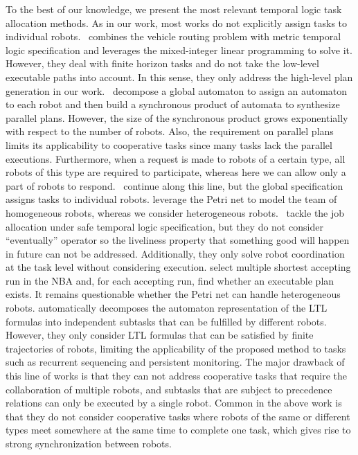 \documentclass[Afour,sageh,times]{sagej}
\begin{document}
To the best of our knowledge, we present the most relevant temporal logic task allocation methods. As in our work, most works do not explicitly assign tasks to individual robots.~\cite{karaman2011linear} combines the vehicle routing problem with metric temporal logic specification and leverages the mixed-integer linear programming to solve it. However, they deal with finite horizon tasks and do not take the low-level executable paths into account. In this sense, they only address the high-level plan generation in our work.~\cite{chen2011formal,leahy2015distributed} decompose a global automaton to assign an automaton to each robot and then build a synchronous product of automata to synthesize parallel plans. However, the size of the synchronous product grows exponentially with respect to the number of robots. Also, the requirement on parallel plans limits its applicability to cooperative tasks since many tasks lack the parallel executions. Furthermore, when a request is made to robots of a certain type, all robots of this type are required to participate, whereas here we can allow only a part of robots to respond.~\cite{ulusoy2013optimality} continue along this line, but
the global specification assigns tasks to individual robots. \cite{lacerda2019petri,kloetzer2020path} leverage the Petri net to model the team of homogeneous robots, whereas we consider heterogeneous robots.~\cite{lacerda2019petri} tackle the job allocation under safe temporal logic specification, but they do not consider ``eventually'' operator so the liveliness property that something good will happen in future can not be addressed. Additionally, they only solve robot coordination at the task level without considering execution. \cite{kloetzer2020path}  select multiple shortest accepting run in the NBA and, for each accepting run, find whether an executable plan exists. It remains questionable whether the Petri net can handle heterogeneous robots. \cite{schillinger2018decomposition,schillinger2018simultaneous,faruq2018simultaneous} automatically decomposes the automaton representation of the LTL formulas into independent subtasks that can be fulfilled by different robots. However, they only consider LTL formulas that can be satisfied by finite trajectories of robots, limiting the applicability of the proposed method to tasks such as recurrent sequencing and persistent monitoring. The major drawback of this line of works is that they can not address cooperative tasks that require the collaboration of multiple robots, and subtasks that are subject to precedence relations can only be executed by a single robot. Common in the above work is that they do not consider cooperative tasks where robots of the same or different types meet somewhere at the same time to complete one task, which gives rise to strong synchronization between robots.
\end{document}
